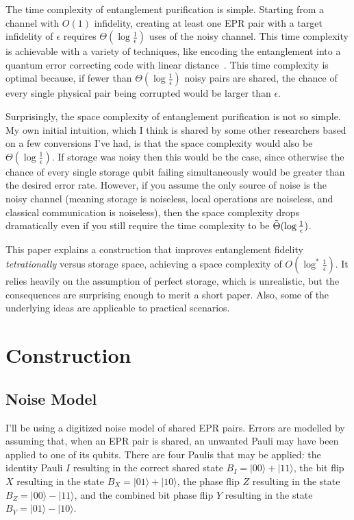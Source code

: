 \documentclass[onecolumn,unpublished,a4paper]{quantumarticle}
\theoremstyle{definition}
\theoremstyle{definition}
\theoremstyle{definition}
\begin{document}
The time complexity of entanglement purification is simple.
Starting from a channel with $O(1)$ infidelity, creating at least one EPR pair with a target infidelity of $\epsilon$ requires $\Theta(\log \frac{1}{\epsilon})$ uses of the noisy channel.
This time complexity is achievable with a variety of techniques, like encoding the entanglement into a quantum error correcting code with linear distance~\cite{panteleev2021goodldpc}.
This time complexity is optimal because, if fewer than $\Theta(\log \frac{1}{\epsilon})$ noisy pairs are shared, the chance of every single physical pair being corrupted would be larger than $\epsilon$.

Surprisingly, the space complexity of entanglement purification is not so simple.
My own initial intuition, which I think is shared by some other researchers based on a few conversions I've had, is that the space complexity would also be $\Theta(\log \frac{1}{\epsilon})$.
If storage was noisy then this would be the case, since otherwise the chance of every single storage qubit failing simultaneously would be greater than the desired error rate.
However, if you assume the only source of noise is the noisy channel (meaning storage is noiseless, local operations are noiseless, and classical communication is noiseless), then the space complexity drops dramatically even if you still require the time complexity to be $\Tilde{\Theta}(\log \frac{1}{\epsilon})$.

This paper explains a construction that improves entanglement fidelity \emph{tetrationally} versus storage space, achieving a space complexity of $O(\log^\ast \frac{1}{\epsilon})$.
It relies heavily on the assumption of perfect storage, which is unrealistic, but the consequences are surprising enough to merit a short paper.
Also, some of the underlying ideas are applicable to practical scenarios.

\section{Construction}
\label{sec:construction}

\subsection{Noise Model}

I'll be using a digitized noise model of shared EPR pairs.
Errors are modelled by assuming that, when an EPR pair is shared, an unwanted Pauli may have been applied to one of its qubits.
There are four Paulis that may be applied: the identity Pauli $I$ resulting in the correct shared state $B_I = |00\rangle + |11\rangle$, the bit flip $X$ resulting in the state $B_X = |01\rangle + |10\rangle$, the phase flip $Z$ resulting in the state $B_Z = |00\rangle - |11\rangle$, and the combined bit phase flip $Y$ resulting in the state $B_Y = |01\rangle - |10\rangle$.
\end{document}
